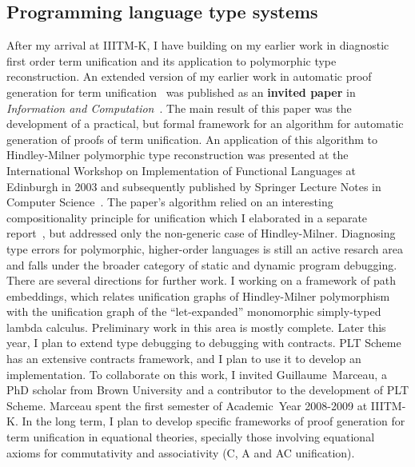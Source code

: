 \documentclass[titlepage, %
11pt, 
]{article}
\newcommand{\achievement}[1]{\textcolor{OliveGreen}{\bf #1}}
\begin{document}
\subsection{Programming language type systems}
\label{subsec:types}
After my arrival at IIITM-K, I have building on my earlier
work in diagnostic first order term unification and its
application to polymorphic type reconstruction.  An extended
version of my earlier work in automatic proof generation for
term unification~\cite{Choppella-Haynes-CADE-2003} was
published as an \achievement{invited paper\/} in {\em
  Information and
  Computation}~\cite{Choppella-Haynes-IAC-2005}.  The main
result of this paper was the development of a practical, but
formal framework for an algorithm for automatic generation
of proofs of term unification.  An application of this
algorithm to Hindley-Milner polymorphic type reconstruction
was presented at the International Workshop on
Implementation of Functional Languages at Edinburgh in 2003
and subsequently published by Springer Lecture Notes in
Computer Science~\cite{Choppella-IFL-2003}.  The paper's
algorithm relied on an interesting compositionality
principle for unification which I elaborated in a separate
report~\cite{Choppella-2004-compositionality}, but addressed
only the non-generic case of Hindley-Milner.  Diagnosing
type errors for polymorphic, higher-order languages is still
an active resarch area and falls under the broader category
of static and dynamic program debugging.  There are several
directions for further work.
%
%
%
I working on a framework of path embeddings, which relates
unification graphs of Hindley-Milner polymorphism with the
unification graph of the ``let-expanded'' monomorphic
simply-typed lambda calculus.  Preliminary work in this area
is mostly complete.  Later this year, I plan to extend type
debugging to debugging with contracts.  PLT Scheme has an
extensive contracts framework, and I plan to use it to
develop an implementation.  To collaborate on this work, I
invited Guillaume~Marceau, a PhD scholar from Brown
University and a contributor to the development of PLT
Scheme.  Marceau spent the first semester of Academic~Year
2008-2009 at IIITM-K.  In the long term, I plan to develop
specific frameworks of proof generation for term unification
in equational theories, specially those involving equational
axioms for commutativity and associativity (C, A and AC
unification).
\end{document}
